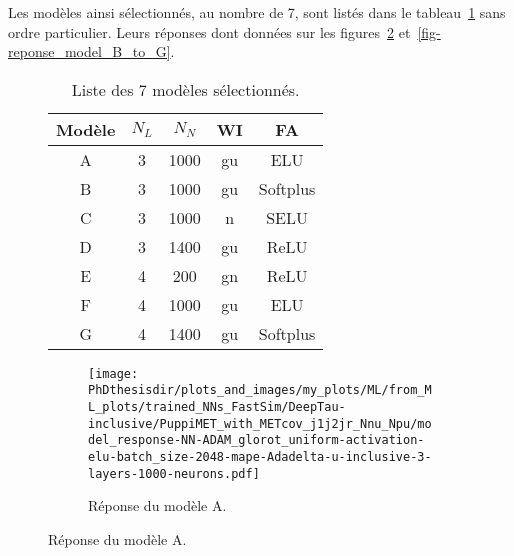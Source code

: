 Les modèles ainsi sélectionnés, au nombre de 7, sont listés dans le tableau~\ref{tab-chapter-ML-section-hyperparameters-others-final} sans ordre particulier.
Leurs réponses dont données sur les figures~\ref{subfig-reponse_model_A} et~\ref{fig-reponse_model_B_to_G}.
\begin{figure}[h]
\centering
\begin{minipage}[c]{.45\textwidth}
\begin{table}[H]
\centering
\begin{tabular}{ccccc}
\toprule
Modèle & $N_L$ & $N_N$ & WI & FA \\
\midrule
A & 3 & \num{1000} & gu & ELU \\
B & 3 & \num{1000} & gu & Softplus \\
C & 3 & \num{1000} & n & SELU \\
D & 3 & \num{1400} & gu & ReLU \\
E & 4 & \num{200} & gn & ReLU \\
F & 4 & \num{1000} & gu & ELU \\
G & 4 & \num{1400} & gu & Softplus \\
\bottomrule
\end{tabular}
\caption{Liste des 7 modèles sélectionnés.}
\label{tab-chapter-ML-section-hyperparameters-others-final}
\end{table}
\end{minipage}
\hfill
\begin{minipage}[c]{.45\textwidth}
\begin{figure}[H]
\texttt{[image: \\PhDthesisdir/plots\_and\_images/my\_plots/ML/from\_ML\_plots/trained\_NNs\_FastSim/DeepTau-inclusive/PuppiMET\_with\_METcov\_j1j2jr\_Nnu\_Npu/model\_response-NN-ADAM\_glorot\_uniform-activation-elu-batch\_size-2048-mape-Adadelta-u-inclusive-3-layers-1000-neurons.pdf]}

\caption{Réponse du modèle A.}
\label{subfig-reponse_model_A}
\end{figure}
\end{minipage}
\end{figure}

